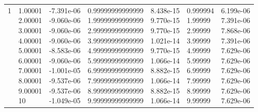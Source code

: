 \documentclass[a4paper,12pt]{article}
\makeatletter
\newcommand{\tcell}[2][c]{\begin{tabu}[#1]{@{}c@{}}#2\end{tabu}}
\makeatother
\begin{document}
{{\begin{tabu}{|X[-1,c]||X[1,c]|X[1,c]||X[2,c]|X[1,c]||X[1,c]|X[1,c]|}
	1 & \tcell{1.00001\\2.00001\\3.00001\\4.00001\\5.00001\\6.00001\\7.00001\\8.00001\\9.00001\\10} & \tcell{-7.391e-06\\-9.060e-06\\-9.060e-06\\-9.060e-06\\-8.583e-06\\-9.060e-06\\-1.001e-05\\-9.537e-06\\-9.537e-06\\-1.049e-05} & \tcell{0.99999999999999\\1.99999999999999\\2.99999999999999\\3.99999999999999\\4.99999999999999\\5.99999999999999\\6.99999999999999\\7.99999999999999\\8.99999999999999\\9.99999999999999} & \tcell{8.438e-15\\9.770e-15\\9.770e-15\\1.021e-14\\9.770e-15\\1.066e-14\\8.882e-15\\1.066e-14\\8.882e-15\\1.066e-14} & \tcell{0.999994\\1.99999\\2.99999\\3.99999\\4.99999\\5.99999\\6.99999\\7.99999\\8.99999\\9.99999} & \tcell{6.199e-06\\7.391e-06\\7.868e-06\\7.391e-06\\7.629e-06\\7.629e-06\\7.629e-06\\7.629e-06\\7.629e-06\\7.629e-06}\\

\end{tabu}}}
\end{document}
